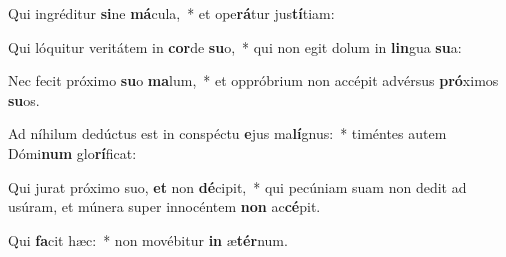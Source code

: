 \item Qui ingréditur \textbf{si}ne \textbf{má}cula,~* et ope\textbf{rá}tur jus\textbf{tí}tiam:
\item Qui lóquitur veritátem in \textbf{cor}de \textbf{su}o,~* qui non egit dolum in \textbf{lin}gua \textbf{su}a:
\item Nec fecit próximo \textbf{su}o \textbf{ma}lum,~* et oppróbrium non accépit advérsus \textbf{pró}ximos \textbf{su}os.
\item Ad níhilum dedúctus est in conspéctu \textbf{e}jus ma\textbf{lí}gnus:~* timéntes autem Dómi\textbf{num} glo\textbf{rí}ficat:
\item Qui jurat próximo suo, \textbf{et} non \textbf{dé}cipit,~* qui pecúniam suam non dedit ad usúram, et múnera super innocéntem \textbf{non} ac\textbf{cé}pit.
\item Qui \textbf{fa}cit hæc:~* non movébitur \textbf{in} æ\textbf{tér}num.
